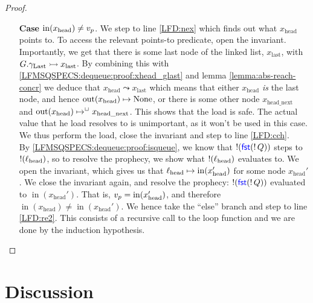 \documentclass[a4paper, 10pt]{report}
\theoremstyle{definition}
\newcommand{\locN}[1]{\loc_{\mathrm{#1}}}
\newcommand{\lochead}{\locN{head}}
\newcommand{\nIn}[1]{\operatorname{in}(#1)}
\newcommand{\nOut}[1]{\operatorname{out}(#1)}
\newcommand{\node}{x}
\newcommand{\nodeN}[1]{\node_{\mathrm{#1}}}
\newcommand{\nodehead}{\nodeN{head}}
\newcommand{\nodelast}{\nodeN{last}}
\newcommand{\nodeheadnext}{\nodeN{head\_next}}
\newcommand{\prophval}{\val_p}
\newcommand{\Qg}{G}
\newcommand{\glast}{\gname_{\mathrm{Last}}}
\newcommand{\reach}[2]{#1 \leadsto #2}
\newcommand{\ap}[2]{#1 \rightarrowtail #2}
\begin{document}
\begin{proof}
\begin{itemize}
    \item[\textbf{Case}] $\nIn{\nodehead} \neq \prophval$.
    We step to line \ref{LFD:nex} which finds out what $\nodehead$ points to. To access the relevant points-to predicate, open the invariant. Importantly, we get that there is some last node of the linked list, $\nodelast$, with $\ap{\Qg.\glast}{\nodelast}$. By combining this with \ref{LFMSQSPECS:dequeue:proof:xhead_glast} and lemma \ref{lemma:abs-reach-concr} we deduce that $\reach{\nodehead}{\nodelast}$ which means that either $\nodehead$ \textit{is} the last node, and hence $\nOut{\nodehead} \mapsto \None$, or there is some other node $\nodeheadnext$ and $\nOut{\nodehead} \mapsto^{\persistently} \nodeheadnext$. This shows that the load is safe. The actual value that he load resolves to is unimportant, as it won't be used in this case. We thus perform the load, close the invariant and step to line \ref{LFD:cch}.\\
    By \ref{LFMSQSPECS:dequeue:proof:isqueue}, we know that $\mathop{!}(\operatorname{\textsf{\color{blue} fst}} (\mathop{!} Q))$ steps to $\deref(\lochead)$, so to resolve the prophecy, we show what $\deref(\lochead)$ evaluates to. We open the invariant, which gives us that $\lochead \mapsto \nIn{\nodehead'}$ for some node $\nodehead'$. We close the invariant again, and resolve the prophecy: $\mathop{!}(\operatorname{\textsf{\color{blue} fst}} (\mathop{!} Q))$ evaluated to $\nIn{\nodehead'}$. That is, $\prophval = \nIn{\nodehead'}$, and therefore $\nIn{\nodehead} \neq \nIn{\nodehead'}$. We hence take the ``else'' branch and step to line \ref{LFD:re2}. This consists of a recursive call to the loop function and we are done by the induction hypothesis.
  \end{itemize}
\end{proof}

\section{Discussion}
\label{LFMSQSPECS:section:discussion}
\end{document}
